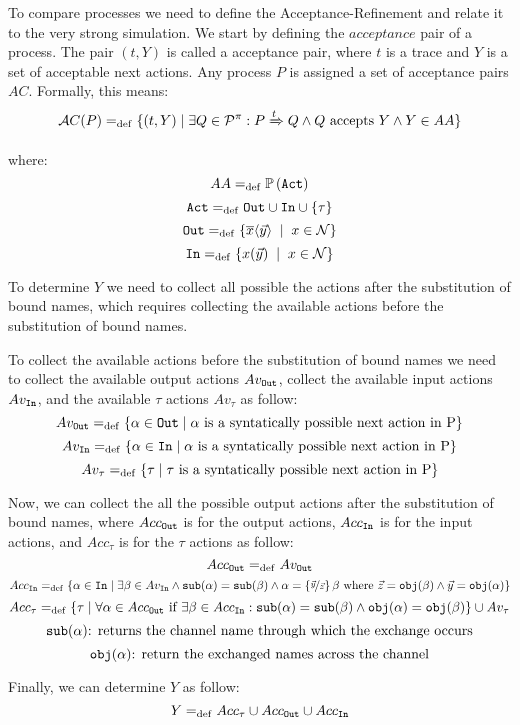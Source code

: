 To compare \picalc{} processes we need to define the Acceptance-Refinement and relate it to the very strong simulation. We start by defining the $acceptance$ pair of a process.
The pair $(t, Y)$ is called a acceptance pair, where $t$ is a trace and $Y$ is a set of acceptable next actions. Any process
$P$ is assigned a set of acceptance pairs $AC$. Formally, this means:
\begin{align}
    \Accepatances[P] \define \{(t,Y) \mid \exists Q\in\procs: P \bigstep{t} Q \wedge Q \text{ accepts } Y \wedge Y\in AA\}
\label{failure}
\end{align}

where: 
\[AA =_{\mathrm{def}} \mathbb P\left(\mathtt{Act}\right)\]
\[\actions\define\outA\cup\inA\cup\set{\tau}\]
\[\outA\define\set[x\in\names]{\out{x}{\vec{y}}}\]
\[\inA\define\set[x\in\names]{\inp{x}{\vec{y}}}\]

To determine $Y$ we need to collect all possible the actions after the substitution of bound names, which requires collecting the available actions before the substitution of bound names.

To collect the available actions before the substitution of bound names we need to collect the available output actions $Av_{\mathtt{Out}}$, collect the available input actions $Av_{\mathtt{In}}$, and the available $\tau$ actions $Av_\tau$ as follow:
\[Av_{\mathtt{Out}}=_{\mathrm{def}}\{ \alpha \in \mathtt{Out} \mid \alpha\text{ is a syntatically possible next action in P}\}\]
\[Av_{\mathtt{In}}=_{\mathrm{def}}\{ \alpha \in \mathtt{In} \mid \alpha\text{ is a syntatically possible next action in P}\}\]
\[Av_\tau=_{\mathrm{def}}\{ \tau \mid \tau\text{ is a syntatically possible next action in P}\}\]

Now, we can collect the all the possible output actions after the substitution of bound names, where $Acc_{\mathtt{Out}}$ is for the output actions, $Acc_{\mathtt{In}}$ is for the input actions, and $Acc_\tau$ is for the $\tau$ actions as follow:
\[Acc_{\mathtt{Out}} =_{\mathrm{def}} Av_{\mathtt{Out}}\]
\[Acc_{\mathtt{In}}=_{\mathrm{def}}\{\alpha \in \mathtt{In} \mid \exists \beta \in Av_{\mathtt{In}} \wedge \mathtt{sub}(\alpha)=\mathtt{sub}(\beta) \wedge \alpha=\left\{\nicefrac{\vec{y}}{\vec{z}}\right\}\beta \text{ where } \vec{z}=\mathtt{obj}(\beta) \wedge \vec{y}=\mathtt{obj}(\alpha) \}\]
\[Acc_\tau=_{\mathrm{def}}\{\tau \mid \forall \alpha \in Acc_{\mathtt{Out}} \text{ if } \exists \beta \in Acc_{\mathtt{In}}  :\mathtt{sub}(\alpha)=\mathtt{sub}(\beta) \wedge \mathtt{obj}(\alpha)=\mathtt{obj}(\beta)  \}\cup Av_\tau\]
\[\mathtt{sub}(\alpha) \text{: returns the channel name through which the exchange occurs}\]
\[\mathtt{obj}(\alpha) \text{: return the exchanged names across the channel}\]

Finally, we can determine $Y$ as follow:
\[Y =_{\mathrm{def}} Acc_\tau \cup Acc_{\mathtt{Out}} \cup Acc_{\mathtt{In}}\]


